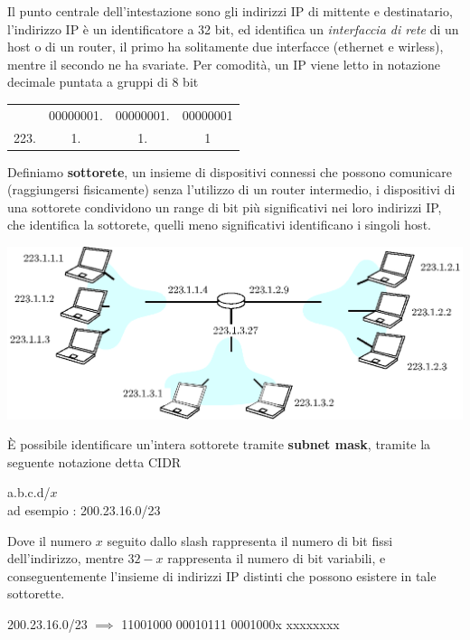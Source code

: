 \documentclass[12pt, letterpaper]{article}
\begin{document}
Il punto centrale dell'intestazione sono gli indirizzi IP di mittente e destinatario, l'indirizzo IP è un identificatore 
a 32 bit, ed identifica un \textit{interfaccia di rete} di un host o di un router, il primo ha solitamente due 
interfacce (ethernet e wirless), mentre il secondo ne ha svariate. Per comodità, un IP viene letto 
in notazione decimale puntata a gruppi di 8 bit \begin{center}
    \begin{tabular}{cccc}
        \cellcolor[HTML]{FFFFFF}{\color[HTML]{000000} 11011111.} & 00000001. & 00000001. & \cellcolor[HTML]{FFFFFF}00000001 \\
        223.                                                     & 1.        & 1.        & 1                               
        \end{tabular}
\end{center}
Definiamo \textbf{sottorete}, un insieme di dispositivi connessi che possono comunicare (raggiungersi fisicamente) senza 
l'utilizzo di un router intermedio, i dispositivi di una sottorete condividono un range di bit più significativi nei 
loro indirizzi IP, che identifica la sottorete, quelli meno significativi identificano i singoli host.\begin{center}
    \includegraphics[width=1\textwidth ]{images/sottoreteIp.eps}
\end{center}
È possibile identificare un'intera sottorete tramite \textbf{subnet mask}, tramite la seguente notazione detta CIDR\begin{center}
    a.b.c.d/$x$ \\ 
    ad esempio : 200.23.16.0/23
\end{center}
Dove il numero $x$ seguito dallo slash rappresenta il numero di bit fissi dell'indirizzo, mentre $32-x$ rappresenta il 
numero di bit variabili, e conseguentemente l'insieme di indirizzi IP distinti che possono esistere in tale sottorette.
\begin{center}
    200.23.16.0/23 $\implies$ 11001000 00010111 0001000x xxxxxxxx
\end{center}
\end{document}
